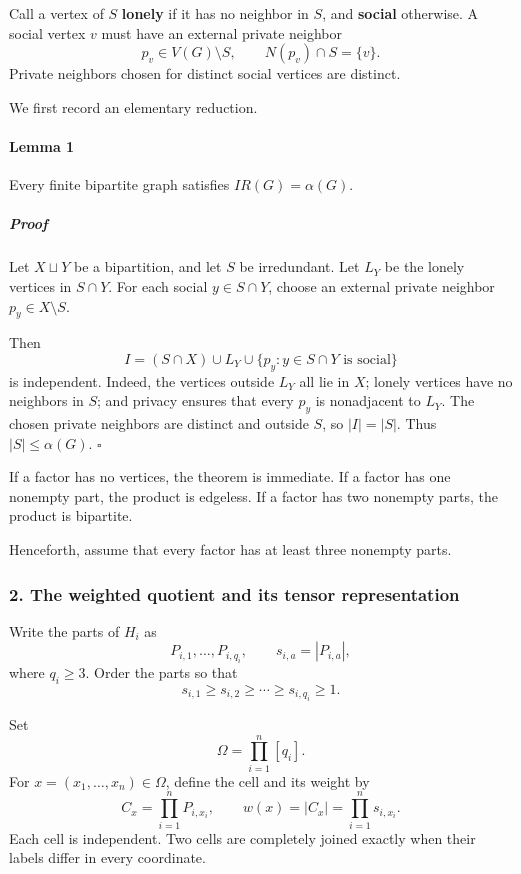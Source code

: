 \documentclass[
  11pt,
  a4paper,
]{article}
\newcounter{none} %
\begin{document}
Call a vertex of \(S\) \textbf{lonely} if it has no neighbor in \(S\),
and \textbf{social} otherwise. A social vertex \(v\) must have an
external private neighbor \[
p_v\in V(G)\setminus S,\qquad N(p_v)\cap S=\{v\}.
\] Private neighbors chosen for distinct social vertices are distinct.

We first record an elementary reduction.

\paragraph{Lemma 1}\label{lemma-1}

Every finite bipartite graph satisfies \(IR(G)=\alpha(G)\).

\subparagraph{Proof}\label{proof}

Let \(X\sqcup Y\) be a bipartition, and let \(S\) be irredundant. Let
\(L_Y\) be the lonely vertices in \(S\cap Y\). For each social
\(y\in S\cap Y\), choose an external private neighbor
\(p_y\in X\setminus S\).

Then \[
I=(S\cap X)\cup L_Y\cup
\{p_y:y\in S\cap Y\text{ is social}\}
\] is independent. Indeed, the vertices outside \(L_Y\) all lie in
\(X\); lonely vertices have no neighbors in \(S\); and privacy ensures
that every \(p_y\) is nonadjacent to \(L_Y\). The chosen private
neighbors are distinct and outside \(S\), so \(|I|=|S|\). Thus
\(|S|\le\alpha(G)\). \(\square\)

If a factor has no vertices, the theorem is immediate. If a factor has
one nonempty part, the product is edgeless. If a factor has two nonempty
parts, the product is bipartite.

Henceforth, assume that every factor has at least three nonempty parts.

\subsubsection{2. The weighted quotient and its tensor
representation}\label{the-weighted-quotient-and-its-tensor-representation}

Write the parts of \(H_i\) as \[
P_{i,1},\ldots,P_{i,q_i},\qquad
s_{i,a}=|P_{i,a}|,
\] where \(q_i\ge 3\). Order the parts so that \[
s_{i,1}\ge s_{i,2}\ge\cdots\ge s_{i,q_i}\ge 1.
\]

Set \[
\Omega=\prod_{i=1}^{n}[q_i].
\] For \(x=(x_1,\ldots,x_n)\in\Omega\), define the cell and its weight
by \[
C_x=\prod_{i=1}^{n}P_{i,x_i},
\qquad
w(x)=|C_x|=\prod_{i=1}^{n}s_{i,x_i}.
\] Each cell is independent. Two cells are completely joined exactly
when their labels differ in every coordinate.
\end{document}
